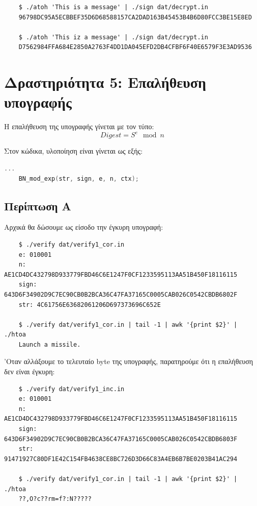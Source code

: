 \documentclass[12pt]{article}
\begin{document}
\begin{lstlisting}
	$ ./atoh 'This is a message' | ./sign dat/decrypt.in
	96798DC95A5ECBBEF35D6D68588157CA2DAD163B45453B4B6D80FCC3BE15E8ED

	$ ./atoh 'This iz a message' | ./sign dat/decrypt.in
	D7562984FFA684E2850A2763F4DD1DA045EFD2DB4CFBF6F40E6579F3E3AD9536
\end{lstlisting}

\section{Δραστηριότητα 5: Επαλήθευση υπογραφής}

Η επαλήθευση της υπογραφής γίνεται με τον τύπο:
\[Digest = S^e \mod n\]

Στον κώδικα, υλοποίηση είναι γίνεται ως εξής: \\
\begin{lstlisting}[language=C]
	...
	BN_mod_exp(str, sign, e, n, ctx);
\end{lstlisting}

\subsection{Περίπτωση Α}

Αρχικά θα δώσουμε ως είσοδο την έγκυρη υπογραφή:

\begin{lstlisting}
	$ ./verify dat/verify1_cor.in
	e: 010001
	n: AE1CD4DC432798D933779FBD46C6E1247F0CF1233595113AA51B450F18116115
	sign: 643D6F34902D9C7EC90CB0B2BCA36C47FA37165C0005CAB026C0542CBDB6802F
	str: 4C61756E63682061206D697373696C652E

	$ ./verify dat/verify1_cor.in | tail -1 | awk '{print $2}' | ./htoa
	Launch a missile.
\end{lstlisting}

'Οταν αλλάξουμε το τελευταίο byte της υπογραφής, παρατηρούμε ότι η επαλήθευση
δεν είναι έγκυρη:

\begin{lstlisting}
	$ ./verify dat/verify1_inc.in
	e: 010001
	n: AE1CD4DC432798D933779FBD46C6E1247F0CF1233595113AA51B450F18116115
	sign: 643D6F34902D9C7EC90CB0B2BCA36C47FA37165C0005CAB026C0542CBDB6803F
	str: 91471927C80DF1E42C154FB4638CE8BC726D3D66C83A4EB6B7BE0203B41AC294

	$ ./verify dat/verify1_cor.in | tail -1 | awk '{print $2}' | ./htoa
	??,O?c??rm=f?:N?????
\end{lstlisting}
\end{document}

